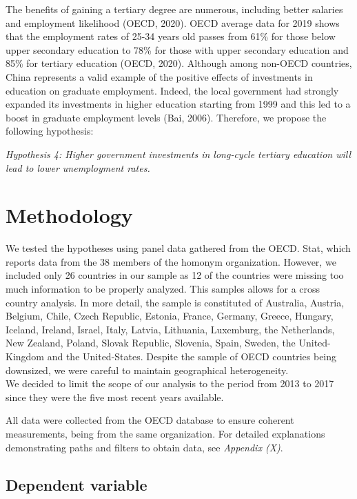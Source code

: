 \documentclass[
]{article}
\begin{document}
The benefits of gaining a tertiary degree are numerous, including better
salaries and employment likelihood (OECD, 2020). OECD average data for
2019 shows that the employment rates of 25-34 years old passes from 61\%
for those below upper secondary education to 78\% for those with upper
secondary education and 85\% for tertiary education (OECD, 2020).
Although among non-OECD countries, China represents a valid example of
the positive effects of investments in education on graduate employment.
Indeed, the local government had strongly expanded its investments in
higher education starting from 1999 and this led to a boost in graduate
employment levels (Bai, 2006). Therefore, we propose the following
hypothesis:

\emph{Hypothesis 4: Higher government investments in long-cycle tertiary
education will lead to lower unemployment rates.}

\hypertarget{methodology}{%
\section{Methodology}\label{methodology}}

We tested the hypotheses using panel data gathered from the OECD. Stat,
which reports data from the 38 members of the homonym organization.
However, we included only 26 countries in our sample as 12 of the
countries were missing too much information to be properly analyzed.
This samples allows for a cross country analysis. In more detail, the
sample is constituted of Australia, Austria, Belgium, Chile, Czech
Republic, Estonia, France, Germany, Greece, Hungary, Iceland, Ireland,
Israel, Italy, Latvia, Lithuania, Luxemburg, the Netherlands, New
Zealand, Poland, Slovak Republic, Slovenia, Spain, Sweden, the
United-Kingdom and the United-States. Despite the sample of OECD
countries being downsized, we were careful to maintain geographical
heterogeneity.\\
We decided to limit the scope of our analysis to the period from 2013 to
2017 since they were the five most recent years available.

All data were collected from the OECD database to ensure coherent
measurements, being from the same organization. For detailed
explanations demonstrating paths and filters to obtain data, see
\emph{Appendix (X)}.

\hypertarget{dependent-variable}{%
\subsection{Dependent variable}\label{dependent-variable}}
\end{document}
